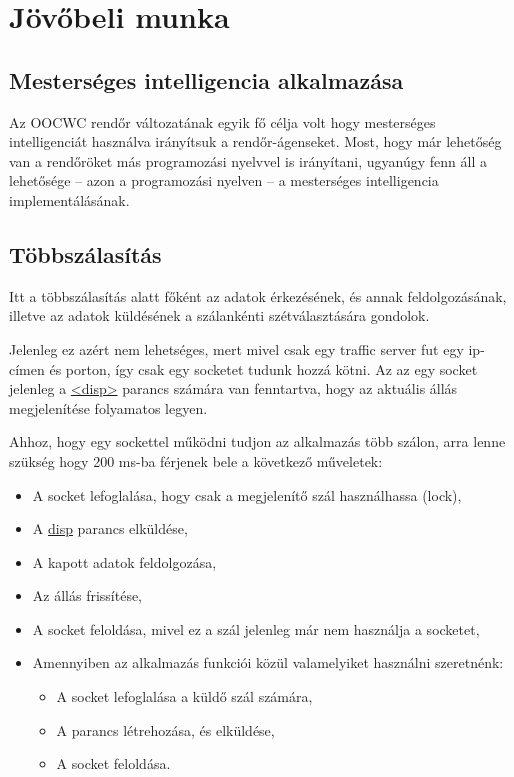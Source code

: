 \documentclass[a4paper,12pt]{report}
\begin{document}
\newpage
\chapter{Jövőbeli munka}
\label{futureworks}

\section{Mesterséges intelligencia alkalmazása}

Az OOCWC rendőr változatának egyik fő célja volt hogy mesterséges intelligenciát használva irányítsuk a rendőr-ágenseket. Most, hogy már lehetőség van a rendőröket más programozási nyelvvel is irányítani, ugyanúgy fenn áll a lehetősége -- azon a programozási nyelven -- a mesterséges intelligencia implementálásának.

\section{Többszálasítás}

Itt a többszálasítás alatt főként az adatok érkezésének, és annak feldolgozásának, illetve az adatok küldésének a szálankénti szétválasztására gondolok. 

\vspace{2mm}
Jelenleg ez azért nem lehetséges, mert mivel csak egy traffic server fut egy ip-címen és porton, így csak egy socketet tudunk hozzá kötni. Az az egy socket jelenleg a \url{<disp>} parancs számára van fenntartva, hogy az aktuális állás megjelenítése folyamatos legyen. 

\vspace{2mm}
Ahhoz, hogy egy sockettel működni tudjon az alkalmazás több szálon, arra lenne szükség hogy 200 ms-ba férjenek bele a következő műveletek:

\begin{itemize}
\item A socket lefoglalása, hogy csak a megjelenítő szál használhassa (lock),
\item A \url{disp} parancs elküldése,
\item A kapott adatok feldolgozása,
\item Az állás frissítése,
\item A socket feloldása, mivel ez a szál jelenleg már nem használja a socketet,
\item Amennyiben az alkalmazás funkciói közül valamelyiket használni szeretnénk:
	\begin{itemize}
	\item A socket lefoglalása a küldő szál számára,
	\item A parancs létrehozása, és elküldése,
	\item A socket feloldása.
	\end{itemize}
\end{itemize}
\end{document}
